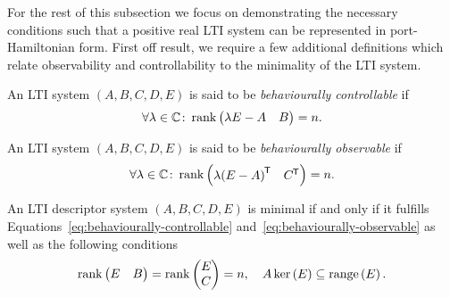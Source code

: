 For the rest of this subsection we focus on demonstrating the necessary conditions such that a positive real LTI system can be represented in port-Hamiltonian form.
First off result, we require a few additional definitions which relate observability and controllability to the minimality of the LTI system.

\begin{definition}\label{def:behaviourally-controllable}
    An LTI system $(A, B, C, D, E)$ is said to be \emph{behaviourally controllable} if
    \begin{equation}\label{eq:behaviourally-controllable}
        \forall \lambda  \in \mathbb{C} \colon \mathop{}\!\mathrm{rank}\left(\begin{matrix}
            \lambda E - A & B
        \end{matrix}\right) = n.
    \end{equation}
\end{definition}

\begin{definition}\label{def:behaviourally-observable}
    An LTI system $(A, B, C, D, E)$ is said to be \emph{behaviourally observable} if
    \begin{equation}\label{eq:behaviourally-observable}
        \forall \lambda  \in \mathbb{C} \colon \mathop{}\!\mathrm{rank}\left(\begin{matrix}
            \lambda {(E - A)}^{\mkern-1.5mu \mathsf{T}} & C^{\mkern-1.5mu \mathsf{T}}
        \end{matrix}\right) = n.
    \end{equation}
\end{definition}

\begin{lemma}\label{lem:minimality-conditions}
    An LTI descriptor system $(A, B, C, D, E)$ is minimal if and only if it fulfills Equations~\eqref{eq:behaviourally-controllable} and~\eqref{eq:behaviourally-observable} as well as the following conditions
    \begin{equation*}
        \mathop{}\!\mathrm{rank}\left(\begin{matrix}
            E & B
        \end{matrix}\right) = \mathop{}\!\mathrm{rank}\left(\begin{matrix}
            E \\
            C
        \end{matrix}\right) = n,\quad A \mathop{}\!\mathrm{ker}\left(E\right) \subseteq \mathop{}\!\mathrm{range}\left(E\right).
    \end{equation*}
\end{lemma}

